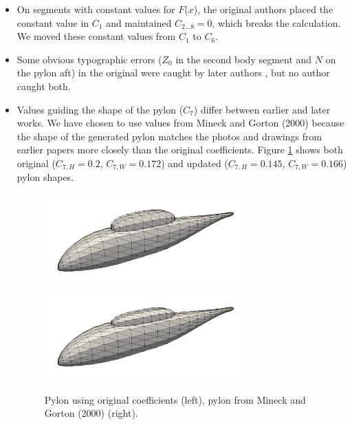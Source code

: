 \documentclass[journal]{new-aiaa}
\begin{document}
\begin{itemize}
\item On segments with constant values for $F$($x$), the original authors placed the constant value in $C_{1}$
and maintained $C_{2...8} = 0$, which breaks the calculation.
We moved these constant values from $C_{1}$ to $C_{6}$.
\item Some obvious typographic errors ($Z_0$ in the second body segment and $N$ on the pylon aft)
in the original \cite{nasa80051} were caught by later authors \cite{nasa87762,mineckgorton}, but no author caught both.
\item Values guiding the shape of the pylon ($C_{7}$) differ between earlier and later works.
We have chosen to use values from Mineck and Gorton (2000) \cite{mineckgorton} because the shape of the generated 
pylon matches the photos and drawings from earlier papers more closely \cite{nasa80051,nasa87762} than the original coefficients.
Figure \ref{badpylon} shows both original ($C_{7,H} = 0.2$, $C_{7,W} = 0.172$) and
updated ($C_{7,H} = 0.145$, $C_{7,W} = 0.166$) pylon shapes.
\begin{figure} \begin{centering}
\includegraphics[width=3.0in]{img_badpylon.png}
\includegraphics[width=3.0in]{img_good.png}
\caption{Pylon using original coefficients (left), pylon from Mineck and Gorton (2000) \cite{mineckgorton} (right).}
\label{badpylon}
\end{centering}\end{figure}%
\end{itemize}
\end{document}
